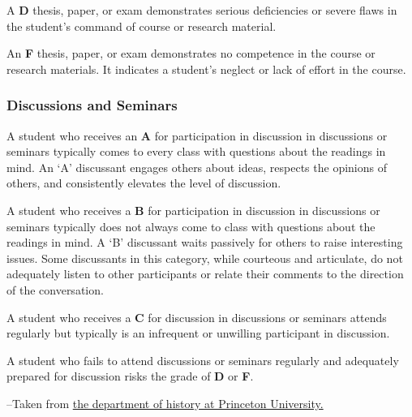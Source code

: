 A \textbf{D} thesis, paper, or exam demonstrates serious deficiencies or
severe flaws in the student's command of course or research material.

An \textbf{F} thesis, paper, or exam demonstrates no competence in the
course or research materials. It indicates a student's neglect or lack
of effort in the course.

\subsubsection{Discussions and Seminars}

A student who receives an \textbf{A} for participation in discussion in
discussions or seminars typically comes to every class with questions
about the readings in mind. An `A' discussant engages others about
ideas, respects the opinions of others, and consistently elevates the
level of discussion.

A student who receives a \textbf{B} for participation in discussion in
discussions or seminars typically does not always come to class with
questions about the readings in mind. A `B' discussant waits passively
for others to raise interesting issues. Some discussants in this
category, while courteous and articulate, do not adequately listen to
other participants or relate their comments to the direction of the
conversation.

A student who receives a \textbf{C} for discussion in discussions or
seminars attends regularly but typically is an infrequent or unwilling
participant in discussion.

A student who fails to attend discussions or seminars regularly and
adequately prepared for discussion risks the grade of \textbf{D} or
\textbf{F}.

--Taken from
\href{http://www.princeton.edu/history/undergraduate/grading_practices/}{the
department of history at Princeton University.}

